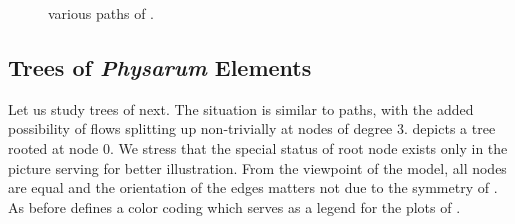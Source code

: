 		\begin{figure}
			\centering
			\qquad
			\newline
			\qquad
			\newline
			\qquad
			\newline
			\qquad
			
			\caption[Simulation - Paths]{various paths of \Pes.}
			\label{fig:paths}
		\end{figure}



	\subsection{Trees of \emph{Physarum} Elements}
		
		Let us study trees of \Pes next. The situation is similar to paths, with the added possibility of flows splitting up non-trivially at nodes of degree $3$.  depicts a tree rooted at node $0$. We stress that the special status of root node exists only in the picture serving for better illustration. From the viewpoint of the model, all nodes are equal and the orientation of the edges matters not due to the symmetry of \Pes. As before  defines a color coding which serves as a legend for the plots of .

